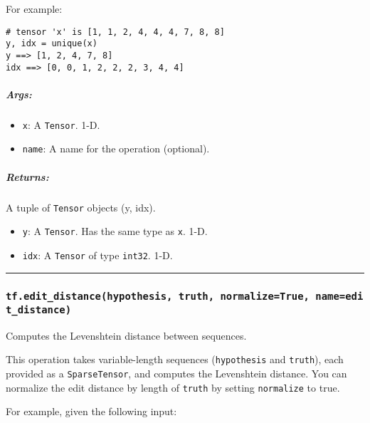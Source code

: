 For example:

\begin{verbatim}
# tensor 'x' is [1, 1, 2, 4, 4, 4, 7, 8, 8]
y, idx = unique(x)
y ==> [1, 2, 4, 7, 8]
idx ==> [0, 0, 1, 2, 2, 2, 3, 4, 4]
\end{verbatim}

\subparagraph{Args: }\label{args-58}

\begin{itemize}
\tightlist
\item
  \texttt{x}: A \texttt{Tensor}. 1-D.
\item
  \texttt{name}: A name for the operation (optional).
\end{itemize}

\subparagraph{Returns: }\label{returns-58}

A tuple of \texttt{Tensor} objects (y, idx).

\begin{itemize}
\tightlist
\item
  \texttt{y}: A \texttt{Tensor}. Has the same type as \texttt{x}. 1-D.
\item
  \texttt{idx}: A \texttt{Tensor} of type \texttt{int32}. 1-D.
\end{itemize}

\begin{center}\rule{0.5\linewidth}{\linethickness}\end{center}

\subsubsection{\texorpdfstring{\texttt{tf.edit\_distance(hypothesis,\ truth,\ normalize=True,\ name=\textquotesingle{}edit\_distance\textquotesingle{})}
}{tf.edit\_distance(hypothesis, truth, normalize=True, name='edit\_distance') }}\label{tf.editux5fdistancehypothesis-truth-normalizetrue-nameeditux5fdistance}

Computes the Levenshtein distance between sequences.

This operation takes variable-length sequences (\texttt{hypothesis} and
\texttt{truth}), each provided as a \texttt{SparseTensor}, and computes
the Levenshtein distance. You can normalize the edit distance by length
of \texttt{truth} by setting \texttt{normalize} to true.

For example, given the following input:

